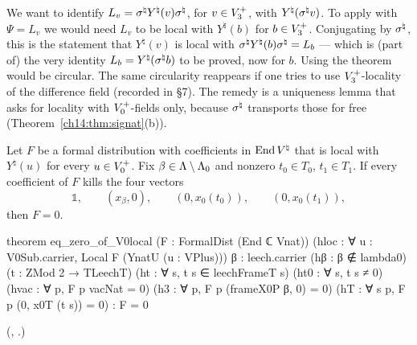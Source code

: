 \begin{warning}[title={Trap / dead end: The circularity of \lean{YnatT_eq_of_creates} in this context}]
We want to identify $L_v=\sigma^{\natural} Y^\natural(v)\sigma^{\natural}$, for $v\in V_3^{+}$, with
$Y^\natural(\sigma^{\natural} v)$.  To apply  with $\Psi=L_v$ we would need $L_v$ to be
local with $Y^\natural(b)$ for $b\in V_3^{+}$.  Conjugating by $\sigma^{\natural}$, this is the statement that
$Y^\natural(v)$ is local with $\sigma^{\natural} Y^\natural(b)\sigma^{\natural}=L_b$ — which is (part of) the very
identity $L_b=Y^\natural(\sigma^{\natural} b)$ to be proved, now for $b$.  Using the theorem would be circular.
The same circularity reappears if one tries to use $V_3^{+}$-locality of the difference field
(recorded in  \S7).  The remedy is a uniqueness lemma that asks for
locality with $V_0^{+}$-fields only, because $\sigma^{\natural}$ transports those for free
(Theorem~\ref{ch14:thm:signat}(b)).
\end{warning}

\begin{theorem}\label{ch14:thm:V0local}
Let $F$ be a formal distribution with coefficients in $\operatorname{End}{V^{\natural}}$ that is local with
$Y^\natural(u)$ for every $u\in V_0^{+}$.  Fix $\beta\in{\Lambda}\setminus{\Lambda}_0$ and nonzero
$t_0\in T_0$, $t_1\in T_1$.  If every coefficient of $F$ kills the four vectors
\begin{equation*}
  \mathbb 1,\qquad (x_\beta,0),\qquad (0,x_0(t_0)),\qquad (0,x_0(t_1)),
\end{equation*}
then $F=0$.
\end{theorem}
\begin{leancode}
theorem eq_zero_of_V0local (F : FormalDist (End ℂ Vnat))
    (hloc : ∀ u : V0Sub.carrier, Local F (YnatU (u : VPlus)))
    {β : leech.carrier} (hβ : β ∉ lambda0) (t : ZMod 2 → TLeechT)
    (ht : ∀ s, t s ∈ leechFrameT s) (ht0 : ∀ s, t s ≠ 0)
    (hvac : ∀ p, F p vacNat = 0) (h3 : ∀ p, F p (frameX0P β, 0) = 0)
    (hT : ∀ s p, F p (0, x0T (t s)) = 0) : F = 0
\end{leancode}
(, .)

